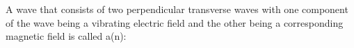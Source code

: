 A wave that consists of two perpendicular transverse waves with one component of the wave 
being a vibrating electric field and the other being a corresponding magnetic field is called a(n):